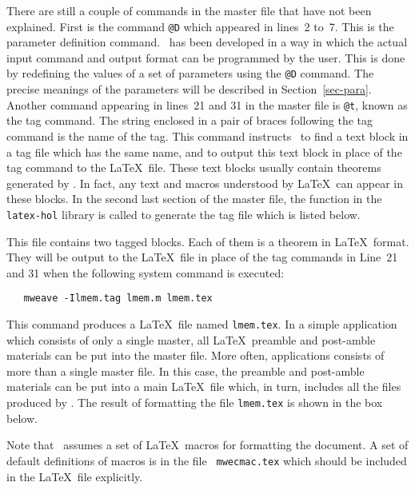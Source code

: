 There are still a couple of commands in the master file that have not been
explained. First is the command \verb|@D| which appeared in lines~2
to~7. This is the parameter definition command. \mweb\ has been
developed in a way in which the actual input command and output
format can be programmed by the user. This is done by redefining the
values of a set of parameters using the \verb|@D| command. The precise
meanings of the parameters will be described in
Section~\ref{sec-para}. Another command appearing in lines~21 and 31 in
the master file is \verb|@t|, known as the tag command. The string
enclosed in a pair of braces following the tag command is the name of
the tag. This command instructs \weave\ to find a text block in a tag
file which has the same name, and to output this text block in place
of the tag command to the \LaTeX\ file. These text blocks usually
contain theorems generated by \HOL. In fact, any text and macros
understood by \LaTeX\ can appear in these blocks. In the second last
section of the master file, the function
 in the {\tt latex-hol} library is
called to generate the tag file which is listed below.


This file contains two tagged blocks. Each of them is a theorem in
\LaTeX\ format. They will be output to the \LaTeX\ file in place of
the tag commands in Line~21 and 31 when the following system command
is executed:
\begin{verbatim}
   mweave -Ilmem.tag lmem.m lmem.tex
\end{verbatim}
This command produces a \LaTeX\ file named {\tt lmem.tex}. In a simple
application which consists of only a single master, all \LaTeX\
preamble and post-amble materials can be put into the master file.
More often, applications consists of more than a single master file.
In this case, the preamble and post-amble materials can be put into a main
\LaTeX\ file which, in turn, includes all the files produced by \weave.
The result of formatting the file {\tt lmem.tex} is shown in the box below.

\noindent
\begin{center}
\begin{boxedminipage}{\textwidth}
\def\sect{\subsection}\def\subsect{\subsubsection}
\def\mlname{\begingroup\makeulother\dotoken{\tt}}
\def\CONST{\begingroup\makeulother\dotoken{\constfont}}
\def\KEYWD{\begingroup\makeulother\dotoken{\keyfont}}
\vspace*{12pt}

\vspace*{12pt}
\end{boxedminipage}
\end{center}
Note that \weave\ assumes a set of \LaTeX\ macros for formatting the
document. A set of default definitions of macros is in the file {\tt
  mwecmac.tex} which should be included in the \LaTeX\ file explicitly.
\endgroup

